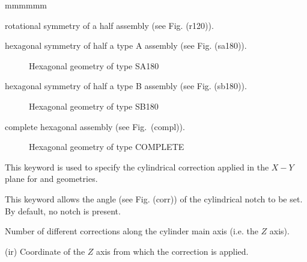 \begin{ListeDeDescription}{mmmmmm}
\item[\moc{R180}] rotational symmetry of a half assembly (see Fig.
\fig(r120)).

\item[\moc{SA180}] hexagonal symmetry of half a type A assembly (see Fig. \fig(sa180)).

\begin{figure}[htbp] 
\begin{center} 
\epsfxsize=5cm
\centerline{ }
\parbox{14cm}{\caption{Hexagonal geometry of type SA180}\label{fig:sa180}} 
\end{center} 
\end{figure}
 
\item[\moc{SB180}] hexagonal symmetry of half a type B assembly (see Fig. \fig(sb180)).

\begin{figure}[htbp] 
\begin{center} 
\epsfxsize=10cm
\centerline{ }
\parbox{14cm}{\caption{Hexagonal geometry of type SB180}\label{fig:sb180}} 
\end{center} 
\end{figure}

\item[\moc{COMPLETE}] complete hexagonal assembly (see Fig.~\fig(compl)).

\begin{figure}[htbp] 
\begin{center} 
\epsfxsize=9cm
\centerline{ }
\parbox{14cm}{\caption{Hexagonal geometry of type COMPLETE}\label{fig:compl}} 
\end{center} 
\end{figure}

\item[\moc{RADS}] This keyword is used to specify the cylindrical correction applied in the $X-Y$ plane for  and  geometries.\cite{roy}

\item[\moc{ANG}] This keyword allows  the angle (see Fig. \fig(corr))
of the cylindrical notch to be set. By default, no notch is present.

\item[\dusa{nrads}] Number of different corrections along the cylinder main axis (i.e. the $Z$ axis).

\item[\dusa{xrad}(ir)] Coordinate of the $Z$ axis from which the correction is applied.


\end{ListeDeDescription}

